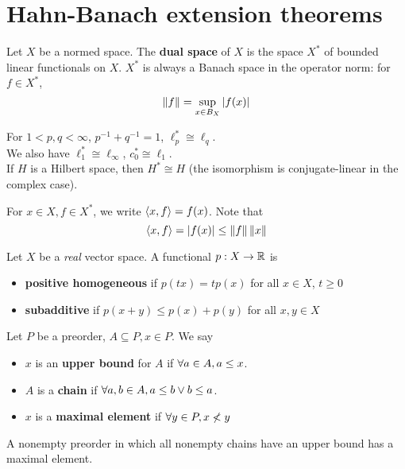 \documentclass{article}
\begin{document}
\clearpage

\section{Hahn-Banach extension theorems}

\newlec

Let $X$ be a normed space. The {\bf dual space} of $X$ is the space $X^*$ of
bounded linear functionals on $X$.
$X^*$ is always a Banach space in the operator norm: for $f \in X^*$,
$$\left\lVert f\right\rVert = \sup_{x \in B_X} |f(x)|$$

\begin{eg}
  For $1 < p, q < \infty$, $p^{-1} + q^{-1} = 1$, $\ell_p^* \cong \ell_q$. \\
  We also have $\ell_1^* \cong \ell_\infty$, $c_0^* \cong \ell_1$. \\
  If $H$ is a Hilbert space, then $H^* \cong H$ (the isomorphism is conjugate-linear in the complex case).
\end{eg}

For $x \in X, f \in X^*$, we write $\left\langle x, f\right\rangle = f(x)$. Note that
$$\left\langle x, f\right\rangle = |f(x)| \le \left\lVert f\right\rVert\left\lVert x\right\rVert$$

\begin{defi}
  Let $X$ be a {\it real} vector space. A functional $p : X \rightarrow \mathbb R$ is
  \begin{itemize}
    \item {\bf positive homogeneous} if $p(tx) = tp(x)$ for all $x \in X$, $t \ge 0$
    \item {\bf subadditive} if $p(x + y) \le p(x) + p(y)$ for all $x, y \in X$
  \end{itemize}
\end{defi}

\begin{defi}
  Let $P$ be a preorder, $A \subseteq P, x \in P$. We say
  \begin{itemize}
    \item $x$ is an {\bf upper bound} for $A$ if $\forall a \in A, a \le x$.
    \item $A$ is a {\bf chain} if $\forall a, b \in A, a \le b \lor b \le a$.
    \item $x$ is a {\bf maximal element} if $\forall y \in P, x \not < y$
  \end{itemize}
\end{defi}

\begin{fact}
  A nonempty preorder in which all nonempty chains have an upper bound has a maximal element.
\end{fact}
\end{document}
